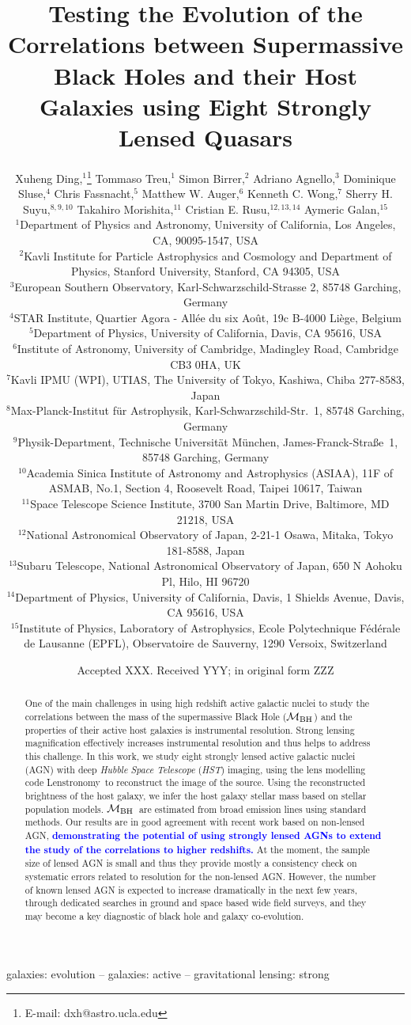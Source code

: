 \documentclass[fleqn,usenatbib]{mnras}
\title[Mass correlations of lensed AGN hosts]{Testing the Evolution of the Correlations between Supermassive Black Holes and their Host Galaxies using Eight Strongly Lensed Quasars}
\author[X. Ding et al.]{
Xuheng Ding,$^{1}$\thanks{E-mail: dxh@astro.ucla.edu}
Tommaso Treu,$^{1}$
Simon Birrer,$^{2}$
Adriano Agnello,$^{3}$\newauthor
Dominique Sluse,$^{4}$
Chris Fassnacht,$^{5}$
Matthew W. Auger,$^{6}$
Kenneth C. Wong,$^{7}$ \newauthor
Sherry H. Suyu,$^{8,9,10}$
Takahiro Morishita,$^{11}$
Cristian E. Rusu,$^{12,13,14}$
Aymeric Galan,$^{15}$
\\
$^{1}$Department of Physics and Astronomy, University of California, Los Angeles, CA, 90095-1547, USA\\
$^{2}$Kavli Institute for Particle Astrophysics and Cosmology and Department of Physics, Stanford University, Stanford, CA 94305, USA\\
$^{3}$European Southern Observatory, Karl-Schwarzschild-Strasse 2, 85748 Garching, Germany\\
$^{4}$STAR Institute, Quartier Agora - All\'ee du six Ao\^ut, 19c B-4000 Li\`ege, Belgium\\
$^{5}$Department of Physics, University of California, Davis, CA 95616, USA\\
$^{6}$Institute of Astronomy, University of Cambridge, Madingley Road, Cambridge CB3 0HA, UK\\
$^{7}$Kavli IPMU (WPI), UTIAS, The University of Tokyo, Kashiwa, Chiba 277-8583, Japan\\
$^{8}$Max-Planck-Institut f{\"u}r Astrophysik, Karl-Schwarzschild-Str.~1, 85748 Garching, Germany\\
$^{9}$Physik-Department, Technische Universit\"at M\"unchen, James-Franck-Stra\ss{}e~1, 85748 Garching, Germany\\
$^{10}$Academia Sinica Institute of Astronomy and Astrophysics (ASIAA), 11F of ASMAB, No.1, Section 4, Roosevelt Road, Taipei 10617, Taiwan\\
$^{11}$Space Telescope Science Institute, 3700 San Martin Drive, Baltimore, MD 21218, USA\\
$^{12}$National Astronomical Observatory of Japan, 2-21-1 Osawa, Mitaka, Tokyo 181-8588, Japan\\
$^{13}$Subaru Telescope, National Astronomical Observatory of Japan, 650 N Aohoku Pl, Hilo, HI 96720\\
$^{14}$Department of Physics, University of California, Davis, 1 Shields Avenue, Davis, CA 95616, USA\\
$^{15}$Institute of Physics, Laboratory of Astrophysics, Ecole Polytechnique 
F\'ed\'erale de Lausanne (EPFL), Observatoire de Sauverny, 1290 Versoix, 
Switzerland
}
\date{Accepted XXX. Received YYY; in original form ZZZ}
\newcommand{\hst}{{\it HST}}
\newcommand{\mbh}{$\mathcal M_{\rm BH}$}
\newcommand{\lenstronomy}{{\sc Lenstronomy}}
\newcommand{\blue}[1]{{\bf \textcolor{blue}{#1}}}
\begin{document}
\label{firstpage}
\pagerange{\pageref{firstpage}--\pageref{lastpage}}
\maketitle

\begin{abstract}
One of the main challenges in using high redshift active galactic nuclei to study the correlations between the mass of the supermassive Black Hole (\mbh) and the properties of their active host galaxies is instrumental resolution. Strong lensing magnification effectively increases instrumental resolution and thus helps to address this challenge. In this work, we study eight strongly lensed active galactic nuclei (AGN) with deep {\it Hubble Space Telescope} (\hst) imaging, using the lens modelling code \lenstronomy\ to reconstruct the image of the source. Using the reconstructed brightness of the host galaxy, we infer the host galaxy stellar mass based on stellar population models.  \mbh\ are estimated from broad emission lines using standard methods. Our results are in good agreement with recent work based on non-lensed AGN, \blue{demonstrating the potential of using strongly lensed AGNs to extend the study of the correlations to higher redshifts.}
At the moment, the sample size of lensed AGN is small and thus they provide mostly a consistency check on systematic errors related to resolution for the non-lensed AGN. However, the number of known lensed AGN is expected to increase dramatically in the next few years, through dedicated searches in ground and space based wide field surveys, and they may become a key diagnostic of black hole and galaxy co-evolution. 
\end{abstract}

\begin{keywords}
galaxies: evolution -- galaxies: active -- gravitational lensing: strong
\end{keywords}


\end{document}
